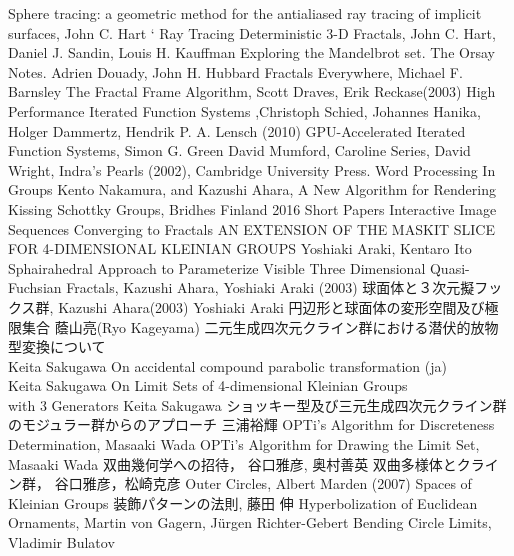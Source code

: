 {
\setlength{\baselineskip}{13pt}
\begin{thebibliography}{99}

        Sphere tracing: a geometric method for the antialiased ray tracing of implicit surfaces, John C. Hart
`
         Ray Tracing Deterministic 3-D Fractals,
         John C. Hart, Daniel J. Sandin, Louis H. Kauffman
         Exploring the Mandelbrot set. The Orsay Notes.
         Adrien Douady, John H. Hubbard
         Fractals Everywhere, Michael F. Barnsley
        The Fractal Frame Algorithm, Scott Draves, Erik Reckase(2003)
         High Performance Iterated Function Systems
         ,Christoph Schied, Johannes Hanika, Holger Dammertz, Hendrik P. A. Lensch (2010)
         GPU-Accelerated Iterated Function Systems,
         Simon G. Green
         David Mumford, Caroline Series, David Wright, Indra's Pearls
         (2002), Cambridge University Press.
         Word Processing In Groups
         Kento Nakamura, and Kazushi Ahara, A New Algorithm for
         Rendering Kissing Schottky Groups,
         Bridhes Finland 2016 Short Papers
        Interactive Image Sequences Converging to Fractals
        AN EXTENSION OF THE MASKIT SLICE FOR 4-DIMENSIONAL KLEINIAN GROUPS
        Yoshiaki Araki, Kentaro Ito
        Sphairahedral Approach to Parameterize Visible Three Dimensional Quasi-Fuchsian Fractals,
        Kazushi Ahara, Yoshiaki Araki (2003)
        球面体と３次元擬フックス群,
        Kazushi Ahara(2003)
        Yoshiaki Araki
        円辺形と球面体の変形空間及び極限集合
        蔭山亮(Ryo Kageyama)
        二元生成四次元クライン群における潜伏的放物型変換について\\
        Keita Sakugawa
        On accidental compound parabolic transformation (ja)\\
        Keita Sakugawa
        On Limit Sets of 4-dimensional Kleinian Groups\\
with 3 Generators
        Keita Sakugawa
        ショッキー型及び三元生成四次元クライン群のモジュラー群からのアプローチ
        三浦裕輝
        OPTi's Algorithm for Discreteness Determination,
        Masaaki Wada
        OPTi's Algorithm for Drawing the Limit Set,
        Masaaki Wada
        双曲幾何学への招待，
        谷口雅彦, 奥村善英
        双曲多様体とクライン群，
        谷口雅彦，松崎克彦
        Outer Circles, Albert Marden (2007)
        Spaces of Kleinian Groups
        装飾パターンの法則,
        藤田 伸
        Hyperbolization of Euclidean Ornaments,
        Martin von Gagern, Jürgen Richter-Gebert
        Bending Circle Limits,
        Vladimir Bulatov
\end{thebibliography}
}